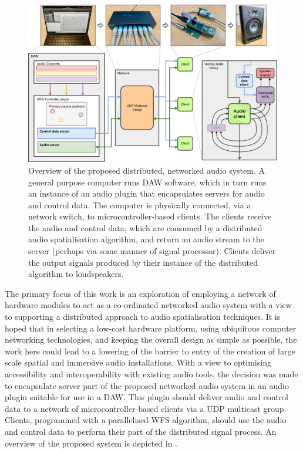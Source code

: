 \begin{figure}[ht]
    \centering
    \includegraphics[width=\textwidth]{figures/system_overview}
    \caption{
        Overview of the proposed distributed, networked audio system.
        A general purpose computer runs DAW software, which in turn runs an
        instance of an audio plugin that encapsulates servers for audio and
        control data.
        The computer is physically connected, via a network switch, to
        microcontroller-based clients.
        The clients receive the audio and control data, which are consumed by
        a distributed audio spatialisation algorithm, and return an audio stream
        to the server (perhaps via some manner of signal processor).
        Clients deliver the output signals produced by their instance of the
        distributed algorithm to loudspeakers.
    }
    \label{fig:system-overview}
\end{figure}

The primary focus of this work is an exploration of employing a network of
hardware modules to act as a co-ordinated networked audio system with a view to
supporting a distributed approach to audio spatialisation techniques.
It is hoped that in selecting a low-cost hardware platform, using ubiquitous
computer networking technologies, and keeping the overall design as simple as
possible, the work here could lead to a lowering of the barrier to entry of
the creation of large scale spatial and immersive audio installations.
With a view to optimising accessibility and interoperability with existing audio
tools, the decision was made to encapsulate server part of the proposed
networked audio system in an audio plugin suitable for use in a DAW\@.
This plugin should deliver audio and control data to a network of
microcontroller-based clients via a UDP multicast group.
Clients, programmed with a parallelised WFS algorithm, should use the audio and
control data to perform their part of the distributed signal process.
An overview of the proposed system is depicted in .

